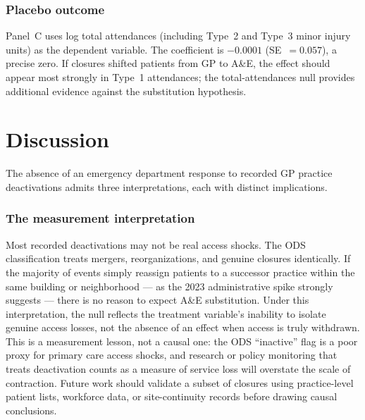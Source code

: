 \documentclass[12pt]{article}
\begin{document}
\subsubsection*{Placebo outcome} Panel~C uses log total attendances (including Type~2 and Type~3 minor injury units) as the dependent variable. The coefficient is $-0.0001$ (SE~$= 0.057$), a precise zero. If closures shifted patients from GP to A\&E, the effect should appear most strongly in Type~1 attendances; the total-attendances null provides additional evidence against the substitution hypothesis.



\section{Discussion}
\label{sec:discussion}

The absence of an emergency department response to recorded GP practice deactivations admits three interpretations, each with distinct implications.

\subsubsection*{The measurement interpretation} Most recorded deactivations may not be real access shocks. The ODS classification treats mergers, reorganizations, and genuine closures identically. If the majority of events simply reassign patients to a successor practice within the same building or neighborhood --- as the 2023 administrative spike strongly suggests --- there is no reason to expect A\&E substitution. Under this interpretation, the null reflects the treatment variable's inability to isolate genuine access losses, not the absence of an effect when access is truly withdrawn. This is a measurement lesson, not a causal one: the ODS ``inactive'' flag is a poor proxy for primary care access shocks, and research or policy monitoring that treats deactivation counts as a measure of service loss will overstate the scale of contraction. Future work should validate a subset of closures using practice-level patient lists, workforce data, or site-continuity records before drawing causal conclusions.
\end{document}

